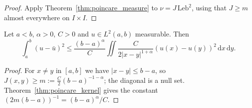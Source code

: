 \begin{proof}
\leanok
Apply Theorem~\ref{thm:poincare_measure} to $\nu = J\, \mathrm{Leb}^2$, using that $J \ge m$ almost everywhere on $I \times I$.
\end{proof}

\begin{theorem}\label{thm:poincare_gagliardo}
\leanok
Let $a < b$, $\alpha > 0$, $C > 0$ and $u \in L^2(a, b)$ measurable. Then
\[
  \int_a^b (u - \bar u)^2 \le \frac{(b - a)^{\alpha}}{C} \iint \frac{C}{2\lvert x - y\rvert^{1+\alpha}} (u(x) - u(y))^2\, \mathrm{d}x\, \mathrm{d}y.
\]
\end{theorem}

\begin{proof}
\leanok
For $x \ne y$ in $[a, b]$ we have $\lvert x - y\rvert \le b - a$, so $J(x, y) \ge m := \frac C2 (b-a)^{-1-\alpha}$; the diagonal is a null set. Theorem~\ref{thm:poincare_kernel} gives the constant $(2 m (b-a))^{-1} = (b-a)^{\alpha}/C$.
\end{proof}
